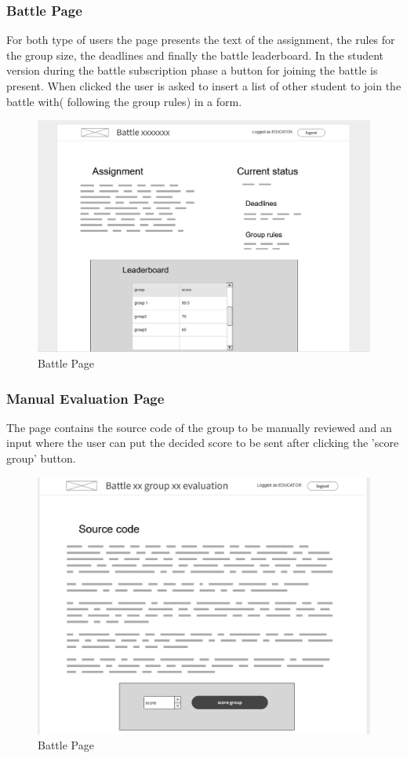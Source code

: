 \subsubsection{Battle Page}
For both type of users the page presents the text of the assignment, the rules for the group size, the deadlines and finally the battle leaderboard.
In the student version during the battle subscription phase a button for joining the battle is present. When clicked the user is asked to insert a list of other student to join the battle with( following the group rules) in a form.

\begin{figure}[H]
    \centering
    \includegraphics[width=1\linewidth]{misc//Images//UI Mockups/battle.png}
    \caption{Battle Page}
    \label{fig:enter-label}
\end{figure}
\newpage
\subsubsection{Manual Evaluation Page}

The page contains the source code of the group to be manually reviewed and an input where the user can put the decided score to be sent after clicking the 'score group' button.

\begin{figure}[H]
    \centering
    \includegraphics[width=1\linewidth]{misc//Images//UI Mockups/manualEval.png}
    \caption{Battle Page}
    \label{fig:enter-label}
\end{figure}